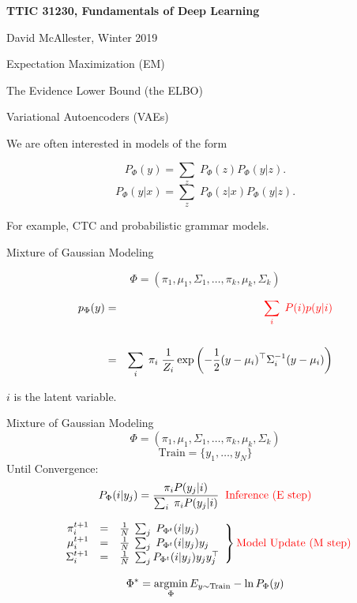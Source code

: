 





{\Huge

  \centerline{\bf TTIC 31230, Fundamentals of Deep Learning}
  \bigskip
  \centerline{David McAllester, Winter 2019}
  \vfill
  \centerline{Expectation Maximization (EM)}
  \vfill
  \centerline{The Evidence Lower Bound (the ELBO)}
  \vfill
  \centerline{Variational Autoencoders (VAEs)}
  \vfill
  \vfill


We are often interested in models of the form

\vfill
{\color{red} $$P_\Phi(y) = \sum_z\;P_\Phi(z)P_\Phi(y|z).$$}
{\color{red} $$P_\Phi(y|x) = \sum_z\;P_\Phi(z|x)P_\Phi(y|z).$$}

\vfill
For example, CTC and probabilistic grammar models.

{Mixture of Gaussian Modeling}

{\color{red} $$\Phi = (\pi_1,\mu_1,\Sigma_1,\ldots,\pi_k,\mu_k,\Sigma_k)$$}

\begin{eqnarray*}
p_\Phi(y) & = & {\color{red} \sum_i\;P(i)p(y|i)} \\
\\
& = & \sum_i\;\pi_i\;\frac{1}{Z_i}\exp\left(-\frac{1}{2}(y-\mu_i)^\top \Sigma_i^{-1}(y - \mu_i)\right)
\end{eqnarray*}

\vfill
{\color{red} $i$ is the latent variable.}

{Mixture of Gaussian Modeling}
\vspace{-4ex}
$$\Phi = (\pi_1,\mu_1,\Sigma_1,\ldots,\pi_k,\mu_k,\Sigma_k)$$
$$\mbox{Train} = \{y_1,\ldots,y_N\}$$
Until Convergence:
$$P_\Phi(i|y_j) = \frac{\pi_iP(y_j|i)}{\sum_i\;\pi_iP(y_j|i)} \;\;\mbox{\color{red} Inference (E step)}$$

$$\left.
\begin{array}{rcl}
  \pi_i^{t+1} & = & \frac{1}{N}\; \sum_j \;P_{\Phi^t}(i|y_j) \\
  \mu_i^{t+1} & = & \frac{1}{N}\; \sum_j \;P_{\Phi^t}(i|y_j)y_j \\
  \Sigma_i^{t+1} & = & \frac{1}{N}\; \sum_j P_{\Phi^t}(i|y_j)y_jy_j^\top
\end{array}
  \right\} \mbox{\color{red} Model Update (M step)}$$

{\color{red} $$\Phi^* = \operatorname*{argmin}_\Phi E_{y \sim \mathrm{Train}} -\ln P_\Phi(y)$$}

}
